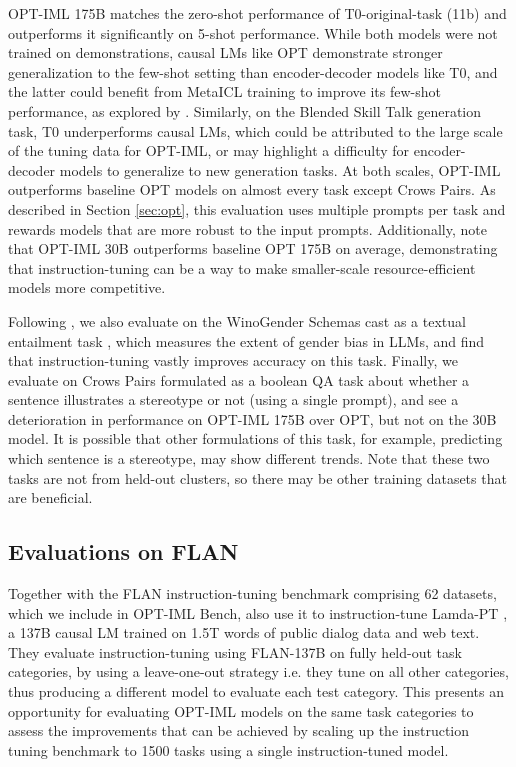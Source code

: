 OPT-IML 175B matches the zero-shot performance of T0-original-task (11b) and outperforms it significantly on 5-shot performance. While both models were not trained on demonstrations, causal LMs like OPT demonstrate stronger generalization to the few-shot setting than encoder-decoder models like T0, and the latter could benefit from MetaICL training to improve its few-shot performance, as explored by \cite{chung2022flanpalm}. Similarly, on the Blended Skill Talk generation task, T0 underperforms causal LMs, which could be attributed to the large scale of the tuning data for OPT-IML, or may highlight a difficulty for encoder-decoder models to generalize to new generation tasks. At both scales, OPT-IML outperforms baseline OPT models on almost every task except Crows Pairs. As described in Section \ref{sec:opt}, this evaluation uses multiple prompts per task and rewards models that are more robust to the input prompts. Additionally, note that OPT-IML 30B outperforms baseline OPT 175B on average, demonstrating that instruction-tuning can be a way to make smaller-scale resource-efficient models more competitive. 

Following \cite{sanh2021t0}, we also evaluate on the WinoGender Schemas \citep{rudinger2018winogender} cast as a textual entailment task \citep{poliak2018dnc}, which measures the extent of gender bias in LLMs, and find that instruction-tuning vastly improves accuracy on this task. Finally, we evaluate on Crows Pairs \citep{nangia2020crows} formulated as a boolean QA task about whether a sentence illustrates a stereotype or not (using a single prompt), and see a deterioration in performance on OPT-IML 175B over OPT, but not on the 30B model. It is possible that other formulations of this task, for example, predicting which sentence is a stereotype, may show different trends. Note that these two tasks are not from held-out clusters, so there may be other training datasets that are beneficial. 

\subsection{Evaluations on FLAN}

Together with the FLAN instruction-tuning benchmark comprising 62 datasets, which we include in OPT-IML Bench, \cite{wei2021flan} also use it to instruction-tune Lamda-PT \citep{thoppilan2022lamda}, a 137B causal LM trained on 1.5T words of public dialog data and web text. They evaluate instruction-tuning using FLAN-137B on fully held-out task categories, by using a leave-one-out strategy i.e. they tune on all other categories, thus producing a different model to evaluate each test category. This presents an opportunity for evaluating OPT-IML models on the same task categories to assess the improvements that can be achieved by scaling up the instruction tuning benchmark to 1500 tasks using a single instruction-tuned model. 

